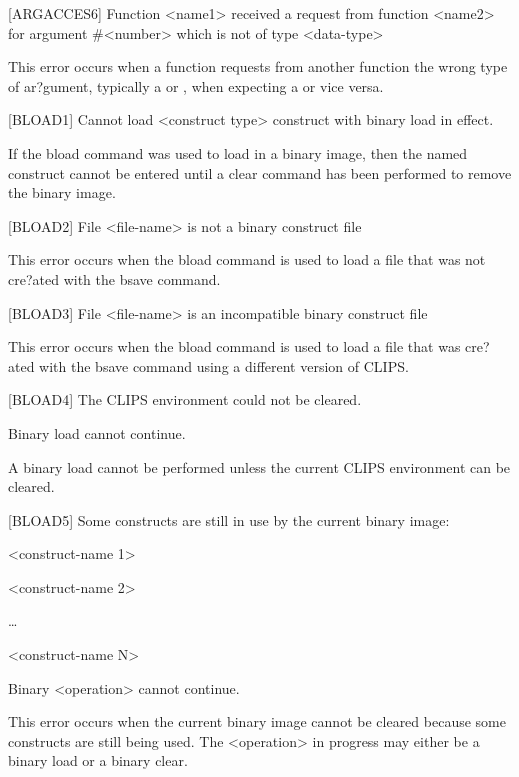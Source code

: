 \documentclass[letterpaper,10pt,english]{sphinxmanual}
\begin{document}
{[}ARGACCES6{]} Function \textless{}name1\textgreater{} received a request from function \textless{}name2\textgreater{}
for argument \#\textless{}number\textgreater{} which is not of type \textless{}data-type\textgreater{}

This error occurs when a function requests from another function the
wrong type of ar?gument, typically a  or , when
expecting a  or vice versa.

{[}BLOAD1{]} Cannot load \textless{}construct type\textgreater{} construct with binary load in
effect.

If the bload command was used to load in a binary image, then the named
construct cannot be entered until a clear command has been performed to
remove the binary image.

{[}BLOAD2{]} File \textless{}file-name\textgreater{} is not a binary construct file

This error occurs when the bload command is used to load a file that was
not cre?ated with the bsave command.

{[}BLOAD3{]} File \textless{}file-name\textgreater{} is an incompatible binary construct file

This error occurs when the bload command is used to load a file that was
cre?ated with the bsave command using a different version of CLIPS.

{[}BLOAD4{]} The CLIPS environment could not be cleared.

Binary load cannot continue.

A binary load cannot be performed unless the current CLIPS environment
can be cleared.

\begin{DUlineblock}{0em}
\item[] {[}BLOAD5{]} Some constructs are still in use by the current binary image:
\item[] \textless{}construct-name 1\textgreater{}
\item[] \textless{}construct-name 2\textgreater{}
\item[] …
\item[] \textless{}construct-name N\textgreater{}
\end{DUlineblock}

Binary \textless{}operation\textgreater{} cannot continue.

This error occurs when the current binary image cannot be cleared
because some constructs are still being used. The \textless{}operation\textgreater{} in
progress may either be a binary load or a binary clear.
\end{document}
